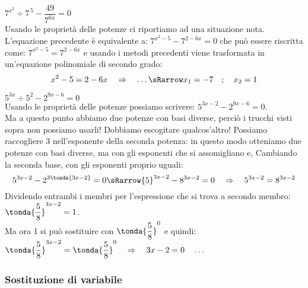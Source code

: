 \begin{esempio}\(7^{x^2} \div 7^{\,5} - \dfrac{49}{7^{6x}} = 0\)\\[4pt] 
Usando le proprietà delle potenze 
ci riportiamo ad una situazione nota. 
L'equazione precedente è equivalente a: 
\(7^{x^2-5} - 7^{2-6x} = 0\) che può essere riscritta come:
\(7^{x^2-5} = 7^{2-6x}\) e usando i metodi precedenti viene 
trasformata in un'equazione polinomiale di secondo grado:
\[x^2-5 = 2-6x \quad\Rightarrow\quad \dots\sRarrow 
x_1=-7 \quad;\quad  x_2=1\]
\end{esempio}

\begin{esempio}
\({5}^{3x} \div 5^2-{2}^{9x-6}=0\)\\[4pt]
Usando le proprietà delle potenze possiamo scrivere: 
\({5}^{3x-2}-{2}^{9x-6}=0\).\\
Ma a questo punto abbiamo due potenze con basi diverse, perciò i trucchi 
visti sopra 
non possiamo usarli! Dobbiamo escogitare qualcos'altro! Possiamo 
raccogliere 3 nell'esponente della seconda potenza: in questo modo 
otteniamo due 
potenze con basi diverse, ma con gli esponenti che si assomigliano e,
Cambiando la seconda base, con gli esponenti proprio uguali:
\[{5}^{3x-2}-{2}^{3\tonda{3x-2}}=0 \sRarrow 
{5}^{3x-2}-{8}^{3x-2}=0 \quad 
\Rightarrow \quad {5}^{3x-2}={8}^{3x-2}\]
Dividendo entrambi i membri per l'espressione che si trova a secondo membro:
\(\tonda{\dfrac{5}{8}}^{3x-2}=1\).\\
Ma ora 1 si può sostituire con \(\tonda{\dfrac{5}{8}}^{0}\) e quindi:
\(\tonda{\dfrac{5}{8}}^{3x-2}=\tonda{\dfrac{5}{8}}^{0} \quad\Rightarrow\quad 
3x-2=0 \quad\dots\)
\end{esempio}

\subsubsection{Sostituzione di variabile}
\label{subsubsec:esplog_sostituzione}


